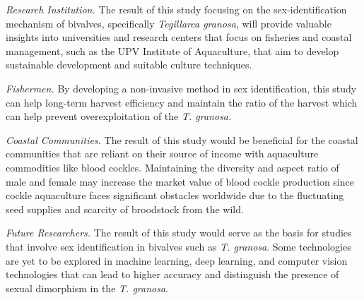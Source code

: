  \textit{Research Institution.} The result of this study focusing on the sex-identification mechanism of bivalves, specifically \textit{Tegillarca granosa}, will provide valuable insights into universities and research centers that focus on fisheries and coastal management, such as the UPV Institute of Aquaculture, that aim to develop sustainable development and suitable culture techniques.

 \textit{Fishermen.} By developing a non-invasive method in sex identification, this study can help long-term harvest efficiency and maintain the ratio of the harvest which can help prevent overexploitation of the \textit{T. granosa.}

 \textit{Coastal Communities.} The result of this study would be beneficial for the coastal communities that are reliant on their source of income with aquaculture commodities like blood cockles. Maintaining the diversity and aspect ratio of male and female may increase the market value of blood cockle production since cockle aquaculture faces significant obstacles worldwide due to the fluctuating seed supplies and scarcity of broodstock from the wild. 

 \textit{Future Researchers.} The result of this study would serve as the basis for studies that involve sex identification in bivalves such as \textit{T. granosa}. Some technologies are yet to be explored in machine learning, deep learning, and computer vision technologies that can lead to higher accuracy and distinguish the presence of sexual dimorphism in the \textit{T. granosa}.


